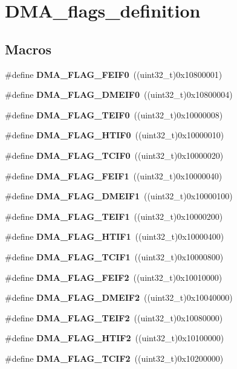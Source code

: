\section{D\+M\+A\+\_\+flags\+\_\+definition}
\label{group__DMA__flags__definition}
\subsection*{Macros}
\begin{DoxyCompactItemize}
\item 
\#define \textbf{ D\+M\+A\+\_\+\+F\+L\+A\+G\+\_\+\+F\+E\+I\+F0}~((uint32\+\_\+t)0x10800001)
\item 
\#define \textbf{ D\+M\+A\+\_\+\+F\+L\+A\+G\+\_\+\+D\+M\+E\+I\+F0}~((uint32\+\_\+t)0x10800004)
\item 
\#define \textbf{ D\+M\+A\+\_\+\+F\+L\+A\+G\+\_\+\+T\+E\+I\+F0}~((uint32\+\_\+t)0x10000008)
\item 
\#define \textbf{ D\+M\+A\+\_\+\+F\+L\+A\+G\+\_\+\+H\+T\+I\+F0}~((uint32\+\_\+t)0x10000010)
\item 
\#define \textbf{ D\+M\+A\+\_\+\+F\+L\+A\+G\+\_\+\+T\+C\+I\+F0}~((uint32\+\_\+t)0x10000020)
\item 
\#define \textbf{ D\+M\+A\+\_\+\+F\+L\+A\+G\+\_\+\+F\+E\+I\+F1}~((uint32\+\_\+t)0x10000040)
\item 
\#define \textbf{ D\+M\+A\+\_\+\+F\+L\+A\+G\+\_\+\+D\+M\+E\+I\+F1}~((uint32\+\_\+t)0x10000100)
\item 
\#define \textbf{ D\+M\+A\+\_\+\+F\+L\+A\+G\+\_\+\+T\+E\+I\+F1}~((uint32\+\_\+t)0x10000200)
\item 
\#define \textbf{ D\+M\+A\+\_\+\+F\+L\+A\+G\+\_\+\+H\+T\+I\+F1}~((uint32\+\_\+t)0x10000400)
\item 
\#define \textbf{ D\+M\+A\+\_\+\+F\+L\+A\+G\+\_\+\+T\+C\+I\+F1}~((uint32\+\_\+t)0x10000800)
\item 
\#define \textbf{ D\+M\+A\+\_\+\+F\+L\+A\+G\+\_\+\+F\+E\+I\+F2}~((uint32\+\_\+t)0x10010000)
\item 
\#define \textbf{ D\+M\+A\+\_\+\+F\+L\+A\+G\+\_\+\+D\+M\+E\+I\+F2}~((uint32\+\_\+t)0x10040000)
\item 
\#define \textbf{ D\+M\+A\+\_\+\+F\+L\+A\+G\+\_\+\+T\+E\+I\+F2}~((uint32\+\_\+t)0x10080000)
\item 
\#define \textbf{ D\+M\+A\+\_\+\+F\+L\+A\+G\+\_\+\+H\+T\+I\+F2}~((uint32\+\_\+t)0x10100000)
\item 
\#define \textbf{ D\+M\+A\+\_\+\+F\+L\+A\+G\+\_\+\+T\+C\+I\+F2}~((uint32\+\_\+t)0x10200000)

\end{DoxyCompactItemize}
